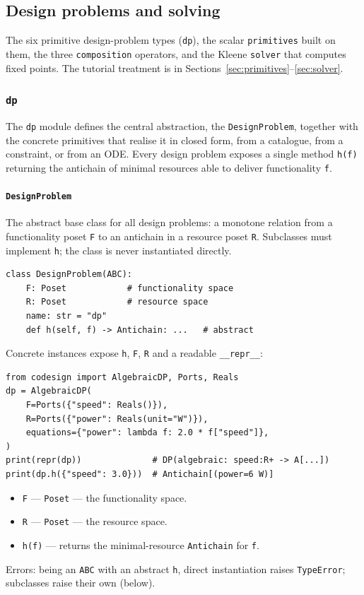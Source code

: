 \documentclass[11pt,a4paper]{article}
\begin{document}
\subsection{Design problems and solving}

The six primitive design-problem types (\texttt{dp}), the scalar
\texttt{primitives} built on them, the three \texttt{composition}
operators, and the Kleene \texttt{solver} that computes fixed points. The
tutorial treatment is in Sections~\ref{sec:primitives}--\ref{sec:solver}.

\subsubsection{\texttt{dp}}
\label{ref:dp}

The \texttt{dp} module defines the central abstraction, the
\texttt{DesignProblem}, together with the concrete primitives that
realise it in closed form, from a catalogue, from a constraint, or from
an ODE. Every design problem exposes a single method \texttt{h(f)}
returning the antichain of minimal resources able to deliver
functionality \texttt{f}.

\paragraph{\texttt{DesignProblem}}
\label{ref:dp:designproblem}
The abstract base class for all design problems: a monotone relation
from a functionality poset \texttt{F} to an antichain in a resource
poset \texttt{R}. Subclasses must implement \texttt{h}; the class is
never instantiated directly.
\begin{lstlisting}
class DesignProblem(ABC):
    F: Poset            # functionality space
    R: Poset            # resource space
    name: str = "dp"
    def h(self, f) -> Antichain: ...   # abstract
\end{lstlisting}
Concrete instances expose \texttt{h}, \texttt{F}, \texttt{R} and a
readable \texttt{\_\_repr\_\_}:
\begin{lstlisting}
from codesign import AlgebraicDP, Ports, Reals
dp = AlgebraicDP(
    F=Ports({"speed": Reals()}),
    R=Ports({"power": Reals(unit="W")}),
    equations={"power": lambda f: 2.0 * f["speed"]},
)
print(repr(dp))              # DP(algebraic: speed:R+ -> A[...])
print(dp.h({"speed": 3.0}))  # Antichain[(power=6 W)]
\end{lstlisting}
\begin{itemize}[nosep]
  \item \texttt{F} --- \texttt{Poset} --- the functionality space.
  \item \texttt{R} --- \texttt{Poset} --- the resource space.
  \item \texttt{h(f)} --- returns the minimal-resource
        \texttt{Antichain} for \texttt{f}.
\end{itemize}
Errors: being an \texttt{ABC} with an abstract \texttt{h}, direct
instantiation raises \texttt{TypeError}; subclasses raise their own
(below).
\end{document}
